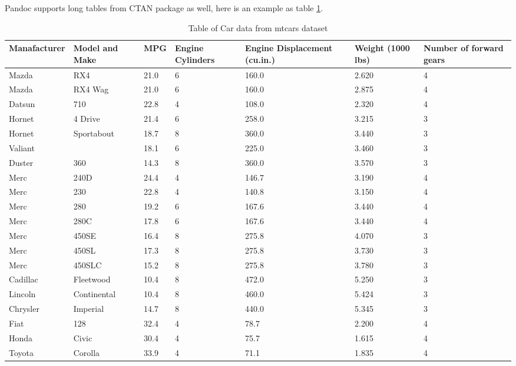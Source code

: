 Pandoc supports long tables from  CTAN package as well, here is an example as table \ref{table:6}.
\begin{longtable}{|p{2cm}|p{2.5cm}|p{1cm}|p{2cm}|p{2cm}|p{2cm}|p{1cm}|}
\caption{Table of Car data from mtcars dataset}
\label{table:6}\\
\hline
\textbf{Manafacturer} & \textbf{Model and Make} & \textbf{MPG} & \textbf{Engine Cylinders} & \textbf{Engine Displacement (cu.in.)} & \textbf{Weight (1000 lbs)} & \textbf{Number of forward gears} \\
\hline
Mazda &RX4         &  21.0  & 6 & 160.0 & 2.620 &   4\\ \hline
Mazda &RX4 Wag      & 21.0  & 6 & 160.0 & 2.875  &  4\\ \hline
Datsun &710         & 22.8  & 4 &108.0 &2.320   & 4\\ \hline
Hornet &4 Drive     & 21.4  & 6 &258.0 &3.215   & 3\\ \hline
Hornet &Sportabout  & 18.7  & 8 &360.0 &3.440   & 3\\ \hline
Valiant     &      &  18.1  & 6 &225.0 &3.460   & 3\\ \hline
Duster &360        &  14.3  & 8 &360.0 &3.570   & 3\\ \hline
Merc &240D         &  24.4  & 4 &146.7 &3.190   & 4\\ \hline
Merc &230         &   22.8  & 4 &140.8 &3.150   & 4\\ \hline
Merc &280          &  19.2  & 6 &167.6 &3.440   & 4\\ \hline
Merc &280C        &   17.8  & 6 &167.6 &3.440   & 4\\ \hline
Merc &450SE        &  16.4  & 8 &275.8 &4.070   & 3\\ \hline
Merc &450SL        &  17.3  & 8 &275.8 &3.730   & 3\\ \hline
Merc &450SLC       &  15.2  & 8 &275.8 &3.780   & 3\\ \hline
Cadillac &Fleetwood & 10.4  & 8 &472.0 &5.250   & 3\\ \hline
Lincoln &Continental& 10.4  & 8 &460.0 &5.424   & 3\\ \hline
Chrysler &Imperial  & 14.7  & 8 &440.0 &5.345   & 3\\ \hline
Fiat & 128          &  32.4 &  4 & 78.7 &2.200  &  4\\ \hline
Honda &Civic        & 30.4  & 4 & 75.7 &1.615   & 4\\ \hline
Toyota &Corolla     & 33.9  & 4 & 71.1 &1.835   & 4\\ \hline

\end{longtable}
